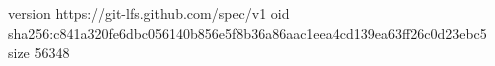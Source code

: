 version https://git-lfs.github.com/spec/v1
oid sha256:c841a320fe6dbc056140b856e5f8b36a86aac1eea4cd139ea63ff26c0d23ebc5
size 56348

